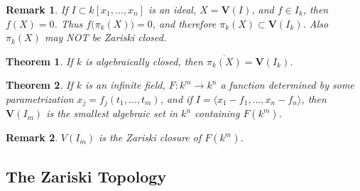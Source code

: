 \documentclass[oneside]{book}
\theoremstyle{mystyle}
\newtheorem{theorem}{Theorem}[section]
\newtheorem{remark}{Remark}[section]
\begin{document}
\begin{remark}
If $I\subset k[x_1,\hdots ,x_n]$ is an ideal, $X = \mathbf{V}(I)$, and $f\in I_k$, then $f(X) = 0$. Thus $f\big(\pi_{k}(X)\big)=0$, and therefore $\pi_{k}(X) \subset \mathbf{V}(I_k)$. Also $\pi_{k}(X)$ may NOT be Zariski closed.
\end{remark}
\begin{theorem}
If $k$ is algebraically closed, then $\overline{\pi_k(X)} = \mathbf{V}(I_k)$.
\end{theorem}
\begin{theorem}
If $k$ is an infinite field, $F:k^m \rightarrow k^n$ a function determined by some parametrization $x_j = f_j(t_1,\hdots, t_m)$, and if $I = \langle x_1-f_1,\hdots, x_n-f_n\rangle$, then $\mathbf{V}(I_m)$ is the smallest algebraic set in $k^n$ containing $F(k^m)$.
\end{theorem}
\begin{remark}
$V(I_m)$ is the Zariski closure of $F(k^m)$.
\end{remark}
\subsection{The Zariski Topology}
\end{document}
